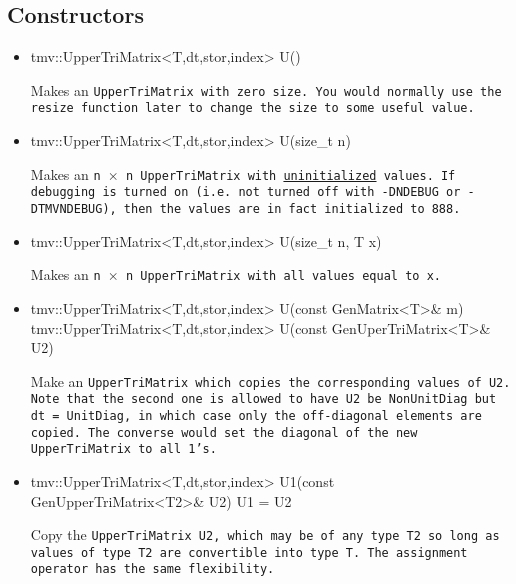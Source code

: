 \subsection{Constructors}
\label{TriMatrix_Constructors}

\begin{itemize}

\item
\begin{tmvcode}
tmv::UpperTriMatrix<T,dt,stor,index> U()
\end{tmvcode}
Makes an \tt{UpperTriMatrix} with zero size.  You would normally use the \tt{resize} function later to
change the size to some useful value.

\item 
\begin{tmvcode}
tmv::UpperTriMatrix<T,dt,stor,index> U(size_t n)
\end{tmvcode}
Makes an \tt{n} $\times$ \tt{n} \tt{UpperTriMatrix} with \underline{uninitialized} values.
If debugging is turned on (i.e. not turned off
with \tt{-DNDEBUG} or \tt{-DTMVNDEBUG}), then the values are in fact initialized to 888.  

\item
\begin{tmvcode}
tmv::UpperTriMatrix<T,dt,stor,index> U(size_t n, T x)
\end{tmvcode}
Makes an \tt{n} $\times$ \tt{n} \tt{UpperTriMatrix} with all values equal to \tt{x}.

\item 
\begin{tmvcode}
tmv::UpperTriMatrix<T,dt,stor,index> U(const GenMatrix<T>& m)
tmv::UpperTriMatrix<T,dt,stor,index> U(const GenUperTriMatrix<T>& U2)
\end{tmvcode}
Make an \tt{UpperTriMatrix} which copies the corresponding values of
\tt{U2}.  Note that the second one is allowed to have \tt{U2} be
\tt{NonUnitDiag} but \tt{dt = UnitDiag}, in which case only the 
off-diagonal elements are copied.  The converse would set the 
diagonal of the new \tt{UpperTriMatrix} to all 1's.

\item
\begin{tmvcode}
tmv::UpperTriMatrix<T,dt,stor,index> U1(const GenUpperTriMatrix<T2>& U2)
U1 = U2
\end{tmvcode}
Copy the \tt{UpperTriMatrix U2}, which may be of any type \tt{T2} so long
as values of type \tt{T2} are convertible into type \tt{T}.
The assignment operator has the same flexibility.


\end{itemize}
